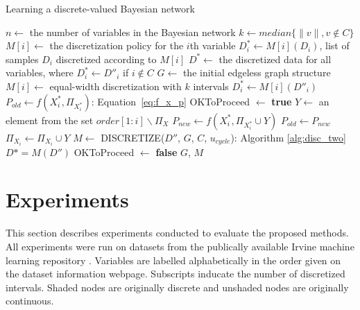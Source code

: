\begin{algorithm}
  \label{alg:structure_learn}
  \caption{ Learning a discrete-valued Bayesian network}
  \begin{algorithmic}[5]
    \State $n \leftarrow$ the number of variables in the Bayesian network
    \State $k \leftarrow median\{ \|v\|, v\notin C\}$
    \State $M[i] \leftarrow$ the discretization policy for the $i$th variable
    \State $D^*_i \leftarrow M[i] (D_i)$, list of samples $D_i$ discretized according to $M[i]$
    \State $D^* \leftarrow $ the discretized data for all variables, where $D^*_i \leftarrow D''_i$ if $i \notin C$
    \State $G \leftarrow$ the initial edgeless graph structure
        \State $M[i] \leftarrow$  equal-width discretization with $k$ intervals
        \State $D^*_i \leftarrow  M[i] (D''_i)$
      \EndIf
    \EndFor
      \State $P_{old} \leftarrow f(X^*_i,\Pi_{X^*_i})$: Equation~\ref{eq:f_x_p}
      \State OKToProceed $\leftarrow$ \textbf{true}
        \State $Y \leftarrow$ an element from the set $order[1:i] \backslash \Pi_X$
        \State $P_{new} \leftarrow f(X^*_i,\Pi_{X^*_i} \cup Y)$
          \State $P_{old} \leftarrow P_{new}$
          \State $\Pi_{X_i} \leftarrow \Pi_{X_i} \cup Y $
          \State $M \leftarrow$ {DISCRETIZE}({$D''$, $G$, $C$, $u_{cycle}$}): Algorithm \ref{alg:disc_two}
          \State $D* = M(D'')$
        \Else
          \State OKToProceed $\leftarrow$ \textbf{false}
        \EndIf
      \EndWhile
    \EndFor
    \State \Return $G$, $M$
  \EndFunction
  \end{algorithmic}
\end{algorithm}


\section{Experiments}
\label{sec:experiments}

This section describes experiments conducted to evaluate the proposed methods.
All experiments were run on datasets from the publically available Irvine machine learning repository \citep{Lichman:2013}.
Variables are labelled alphabetically in the order given on the dataset information webpage.
Subscripts inducate the number of discretized intervals.
Shaded nodes are originally discrete and unshaded nodes are originally continuous.

